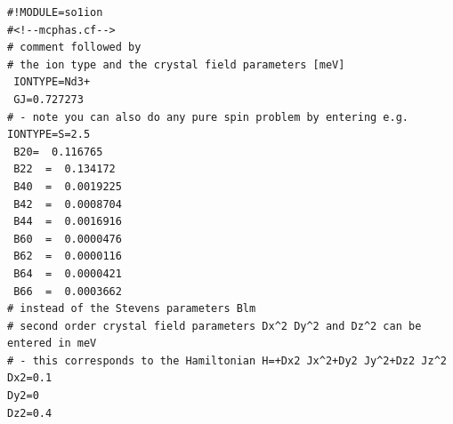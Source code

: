 \begin{verbatim}
#!MODULE=so1ion
#<!--mcphas.cf-->
# comment followed by
# the ion type and the crystal field parameters [meV]
 IONTYPE=Nd3+
 GJ=0.727273
# - note you can also do any pure spin problem by entering e.g. IONTYPE=S=2.5 
 B20=  0.116765                                           
 B22  =  0.134172                                           
 B40  =  0.0019225                                          
 B42  =  0.0008704                                          
 B44  =  0.0016916                                          
 B60  =  0.0000476                                          
 B62  =  0.0000116                                          
 B64  =  0.0000421                                          
 B66  =  0.0003662       
# instead of the Stevens parameters Blm 
# second order crystal field parameters Dx^2 Dy^2 and Dz^2 can be entered in meV
# - this corresponds to the Hamiltonian H=+Dx2 Jx^2+Dy2 Jy^2+Dz2 Jz^2
Dx2=0.1
Dy2=0
Dz2=0.4
\end{verbatim}


